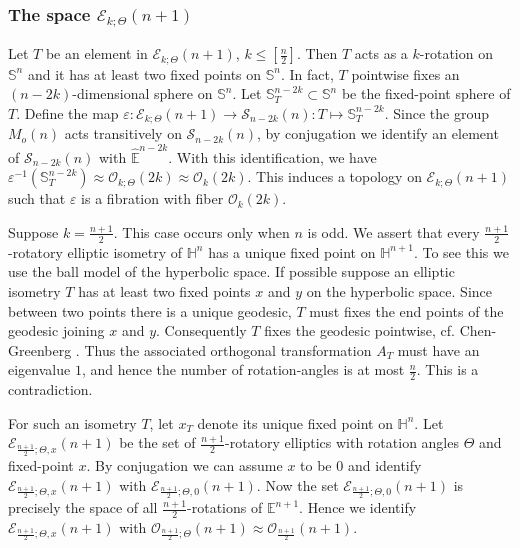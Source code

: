 \documentclass[11pt]{amsart}
\theoremstyle{definition}
\theoremstyle{remark}
\numberwithin{equation}{section}
\theoremstyle{plain}
\begin{document}
\subsubsection*{The space ${\mathcal E}_{k;\Theta}(n+1)$} Let $T$ be an element in  ${\mathcal E}_{k;  \Theta}(n+1)$, $k \leq [\frac{n}{2}]$. Then $T$ acts as a $k$-rotation on ${\mathbb S}^n$ and it has at least two fixed points on ${\mathbb S}^n$. In fact, $T$ pointwise fixes an $(n-2k)$-dimensional sphere on ${\mathbb S}^n$. Let ${\mathbb S}^{n-2k}_T \subset {\mathbb S}^n$ be the fixed-point sphere of $T$. Define the map $\varepsilon: {\mathcal E}_{k;  \Theta}(n+1) \to \mathcal S_{n-2k}(n): T \mapsto {\mathbb S}^{n-2k}_T$. Since the group $M_o(n)$ acts transitively on $\mathcal S_{n-2k}(n)$, by conjugation we identify an element of $\mathcal S_{n-2k}(n)$  with $\hat {\mathbb E}^{n-2k}$. With this identification, we have $\varepsilon^{-1}({\mathbb S}^{n-2k}_T) \approx {\mathcal O}_{k;  \Theta}(2k) \approx {\mathcal O}_{k}(2k)$. This induces a topology on ${\mathcal E}_{k;  \Theta}(n+1)$ such that $\varepsilon$ is a fibration with fiber ${\mathcal O}_{k}(2k)$. 

\medskip Suppose $k=\frac{n+1}{2}$. This case occurs only when $n$ is odd.  We assert that every $\frac{n+1}{2}$-rotatory elliptic isometry of ${\mathbb H}^n$ has a unique fixed point on ${\mathbb H}^{n+1}$. To see this we use the ball model of the hyperbolic space.  If possible suppose an elliptic isometry $T$ has at least two fixed points $x$ and $y$ on the hyperbolic space. Since between two points there is a unique geodesic, $T$ must fixes the end points of the geodesic joining $x$ and $y$. Consequently $T$ fixes the geodesic pointwise, cf. Chen-Greenberg \cite[Lemma 3.3.2]{cg}. Thus the associated orthogonal transformation $A_T$ must have an eigenvalue $1$, and hence the number of rotation-angles is at most $\frac{n}{2}$. This is a contradiction. 

For such an isometry $T$, let $x_T$ denote its unique fixed point on ${\mathbb H}^n$. 
Let \hbox{${\mathcal E}_{\frac{n+1}{2}; \Theta, x}(n+1)$} be the set of $\frac{n+1}{2}$-rotatory elliptics with rotation angles $\Theta$ and fixed-point $x$. By conjugation we can assume $x$ to be $0$ and identify ${\mathcal E}_{\frac{n+1}{2}; \Theta, x}(n+1)$ with ${\mathcal E}_{\frac{n+1}{2}; \Theta, 0}(n+1)$. Now the set ${\mathcal E}_{\frac{n+1}{2}; \Theta, 0}(n+1)$ is precisely the space of all $\frac{n+1}{2}$-rotations of ${\mathbb E}^{n+1}$. Hence we identify ${\mathcal E}_{\frac{n+1}{2}; \Theta, x}(n+1)$ with ${\mathcal O}_{\frac{n+1}{2};  \Theta}(n+1) \approx {\mathcal O}_{\frac{n+1}{2}}(n+1)$.
\end{document}
